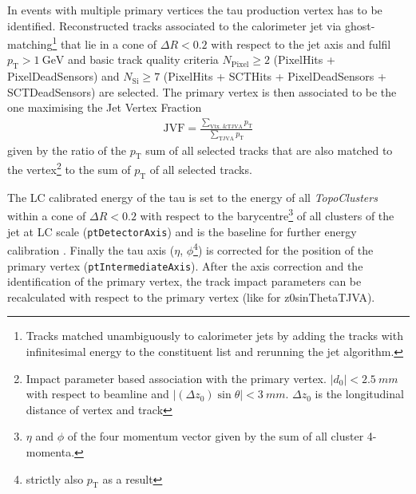 %
%
In events with multiple primary vertices the tau production vertex has to be
identified. Reconstructed tracks associated to the calorimeter jet via
ghost-matching\footnote{Tracks matched unambiguously to calorimeter jets by
  adding the tracks with infinitesimal energy to the constituent list and
  rerunning the jet algorithm.} that lie in a cone of $\Delta R < 0.2$ with
respect to the jet axis and fulfil $p_\mathrm{T} > \SI{1}{\giga\electronvolt}$
and basic track quality criteria $N_\mathrm{Pixel} \geq 2$ (PixelHits +
PixelDeadSensors) and $N_\mathrm{Si} \geq 7$ (PixelHits + SCTHits +
PixelDeadSensors + SCTDeadSensors) are selected. The primary vertex is
then associated to be the one maximising the Jet Vertex Fraction
\begin{align*}
  \mathrm{JVF} = \frac{\sum_\text{Vtx.\ \& TJVA} p_\mathrm{T}}
                                           {\sum_\text{TJVA} p_\mathrm{T}}
\end{align*}
given by the ratio of the $p_\mathrm{T}$ sum of all selected tracks that are
also matched to the vertex\footnote{Impact parameter based association with the
  primary vertex. $|d_0| < \SI{2.5}{mm}$ with respect to beamline and
  $|(\Delta z_0) \sin\theta| < \SI{3}{mm}$. $\Delta z_0$ is the longitudinal
  distance of vertex and track} to the sum of $p_\mathrm{T}$ of all selected
tracks.

The LC calibrated energy of the tau is set to the energy of all
\emph{TopoClusters} within a cone of $\Delta R < 0.2$ with respect to the
barycentre\footnote{$\eta$ and $\phi$ of the four momentum vector given by the
  sum of all cluster 4-momenta.} of all clusters of the jet at LC scale
(\texttt{ptDetectorAxis}) and is the baseline for further energy calibration
. Finally the tau axis ($\eta$,
$\phi$\footnote{strictly also $p_\mathrm{T}$ as a result}) is corrected for the
position of the primary vertex (\texttt{ptIntermediateAxis}). After the axis
correction and the identification of the primary vertex, the track impact
parameters can be recalculated with respect to the primary vertex (like for
z0sinThetaTJVA).

